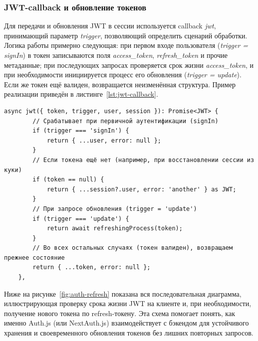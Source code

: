 \subsubsection{JWT-callback и обновление токенов}
Для передачи и обновления JWT в сессии используется callback \textit{jwt}, принимающий параметр \textit{trigger}, позволяющий определить сценарий обработки. Логика работы примерно следующая: при первом входе пользователя (\textit{trigger = signIn}) в токен записываются поля \textit{access\_token}, \textit{refresh\_token} и прочие метаданные; при последующих запросах проверяется срок жизни \textit{access\_token}, и при необходимости инициируется процесс его обновления (\textit{trigger = update}). Если же токен ещё валиден, возвращается неизменённая структура. Пример реализации приведён в листинге~\ref{lst:jwt-callback}.

\begin{lstlisting}[caption={JWT-callback с учётом trigger}, label={lst:jwt-callback}]
	async jwt({ token, trigger, user, session }): Promise<JWT> {
		// Срабатывает при первичной аутентификации (signIn)
		if (trigger === 'signIn') {
			return { ...user, error: null };
		}
		// Если токена ещё нет (например, при восстановлении сессии из куки)
		if (token == null) {
			return { ...session?.user, error: 'another' } as JWT;
		}
		// При запросе обновления (trigger = 'update')
		if (trigger === 'update') {
			return await refreshingProcess(token);
		}
		// Во всех остальных случаях (токен валиден), возвращаем прежнее состояние
		return { ...token, error: null };
	},
\end{lstlisting}

Ниже на рисунке~\ref{fig:auth-refresh} показана вся последовательная диаграмма, иллюстрирующая проверку срока жизни JWT на клиенте и, при необходимости, получение нового токена по refresh-токену. Эта схема помогает понять, как именно Auth.js (или NextAuth.js) взаимодействует с бэкендом для устойчивого хранения и своевременного обновления токенов без лишних повторных запросов.

